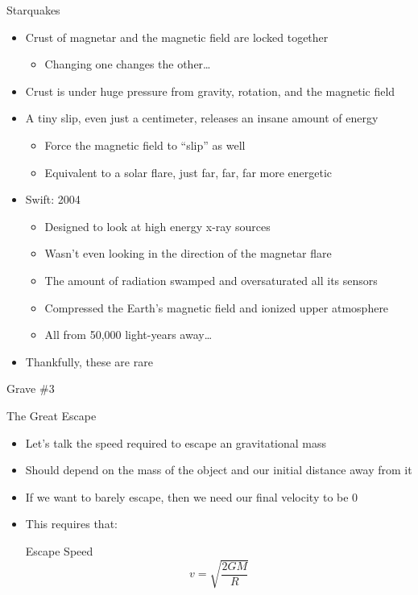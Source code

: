 \documentclass[pdf, aspectratio=169]{beamer}
\begin{document}
\begin{frame}{Starquakes}
  \begin{itemize}
	\item Crust of magnetar and the magnetic field are locked together
	  \begin{itemize}
		\item Changing one changes the other\ldots
	  \end{itemize}
	\item Crust is under huge pressure from gravity, rotation, and the magnetic field
	\item A tiny slip, even just a centimeter, releases an insane amount of energy
	  \begin{itemize}
		\item Force the magnetic field to ``slip'' as well
		\item Equivalent to a solar flare, just far, far, far more energetic
	  \end{itemize}
	\item Swift: 2004
	  \begin{itemize}
		\item Designed to look at high energy x-ray sources
		\item Wasn't even looking in the direction of the magnetar flare
		\item The amount of radiation swamped and oversaturated all its sensors
		\item Compressed the Earth's magnetic field and ionized upper atmosphere
		\item All from 50,000 light-years away\ldots
	  \end{itemize}
	\item Thankfully, these are rare
  \end{itemize}
\end{frame}

\begin{frame}{Grave \#3}
	\begin{center}
	\end{center}
\end{frame}

\begin{frame}{The Great Escape}
  \begin{itemize}
	\item Let's talk the speed required to escape an gravitational mass
	\item Should depend on the mass of the object and our initial distance away from it
	\item If we want to barely escape, then we need our final velocity to be 0
	\item<2> This requires that:
	  \begin{block}{Escape Speed}
		\[v = \sqrt{\frac{2GM}{R}}\]
	  \end{block}
  \end{itemize}
\end{frame}
\end{document}
